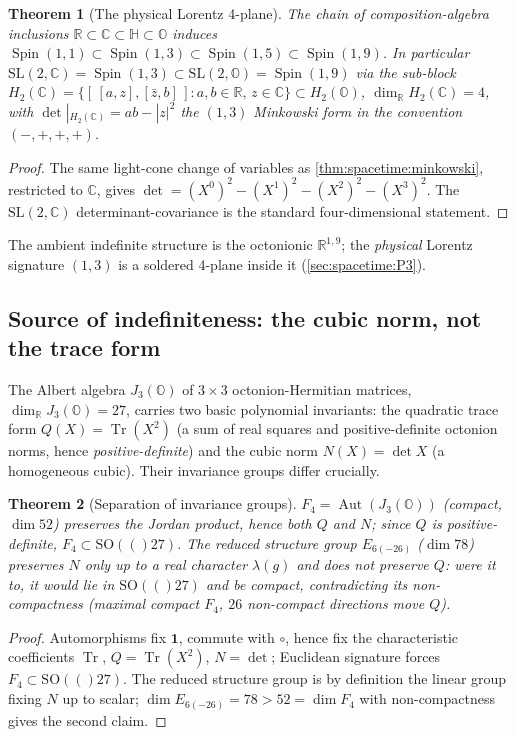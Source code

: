 \documentclass[11pt]{article}
\theoremstyle{plain}
\newtheorem{theorem}{Theorem}[section]
\theoremstyle{definition}
\theoremstyle{remark}
\newcommand{\SO}[1]{\mathrm{SO}(#1)}
\newcommand{\SL}{\mathrm{SL}}
\newcommand{\Spin}{\operatorname{Spin}}
\newcommand{\Aut}{\operatorname{Aut}}
\newcommand{\Tr}{\operatorname{Tr}}
\begin{document}
\begin{theorem}[The physical Lorentz 4-plane]
\label{thm:spacetime:lorentz4}
\label{thm:Lorentz}
The chain of composition-algebra inclusions $\mathbb R\subset\mathbb C\subset\mathbb H\subset\mathbb O$
induces $\Spin(1,1)\subset\Spin(1,3)\subset\Spin(1,5)\subset\Spin(1,9)$. In particular
$\SL(2,\mathbb C)=\Spin(1,3)\subset\SL(2,\mathbb O)=\Spin(1,9)$ via the sub-block
$H_2(\mathbb C)=\{[\,[a,z],[\bar z,b]\,]:a,b\in\mathbb R,\,z\in\mathbb C\}\subset H_2(\mathbb O)$,
$\dim_{\mathbb R}H_2(\mathbb C)=4$, with $\det|_{H_2(\mathbb C)}=ab-|z|^2$ the $(1,3)$
Minkowski form in the convention $(-,+,+,+)$.
\end{theorem}
\begin{proof}
The same light-cone change of variables as \autoref{thm:spacetime:minkowski},
restricted to $\mathbb C$, gives $\det=(X^0)^2-(X^1)^2-(X^2)^2-(X^3)^2$. The
$\SL(2,\mathbb C)$ determinant-covariance is the standard four-dimensional statement.
\end{proof}

The ambient indefinite structure is the octonionic $\mathbb R^{1,9}$; the
\emph{physical} Lorentz signature $(1,3)$ is a soldered 4-plane inside it
(\autoref{sec:spacetime:P3}).

\subsection{Source of indefiniteness: the cubic norm, not the trace form}
\label{sec:spacetime:norm}

The Albert algebra $J_3(\mathbb O)$ of $3\times3$ octonion-Hermitian matrices,
$\dim_{\mathbb R}J_3(\mathbb O)=27$, carries two basic polynomial invariants: the
quadratic trace form $Q(X)=\Tr(X^2)$ (a sum of real squares and positive-definite
octonion norms, hence \emph{positive-definite}) and the cubic norm
$N(X)=\det X$ (a homogeneous cubic). Their invariance groups differ crucially.

\begin{theorem}[Separation of invariance groups]
\label{thm:spacetime:groups}
$F_4=\Aut(J_3(\mathbb O))$ (compact, $\dim 52$) preserves the Jordan product, hence
\emph{both} $Q$ and $N$; since $Q$ is positive-definite, $F_4\subset\SO(27)$. The
reduced structure group $E_{6(-26)}$ ($\dim 78$) preserves $N$ only up to a real
character $\lambda(g)$ and does \emph{not} preserve $Q$: were it to, it would lie in
$\SO(27)$ and be compact, contradicting its non-compactness (maximal compact $F_4$,
$26$ non-compact directions move $Q$).
\end{theorem}
\begin{proof}
Automorphisms fix $\mathbf 1$, commute with $\circ$, hence fix the characteristic
coefficients $\Tr$, $Q=\Tr(X^2)$, $N=\det$; Euclidean signature forces
$F_4\subset\SO(27)$. The reduced structure group is by definition the linear group
fixing $N$ up to scalar; $\dim E_{6(-26)}=78>52=\dim F_4$ with non-compactness gives
the second claim.
\end{proof}
\end{document}
